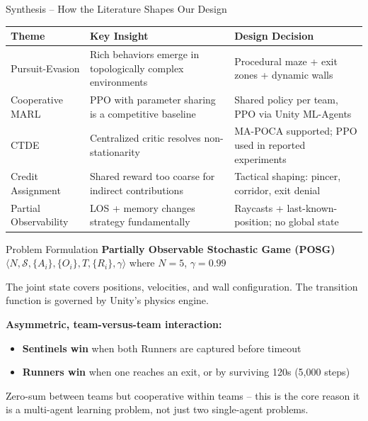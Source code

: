 \documentclass[aspectratio=169,11pt]{beamer}
\begin{document}
\begin{frame}{Synthesis -- How the Literature Shapes Our Design}
\begin{center}
\begin{tabular}{@{}p{2.5cm}p{5cm}p{4.5cm}@{}}
\toprule
\textbf{Theme} & \textbf{Key Insight} & \textbf{Design Decision} \\
\midrule
Pursuit-Evasion & Rich behaviors emerge in topologically complex environments & Procedural maze + exit zones + dynamic walls \\[4pt]
Cooperative MARL & PPO with parameter sharing is a competitive baseline & Shared policy per team, PPO via Unity ML-Agents \\[4pt]
CTDE & Centralized critic resolves non-stationarity & MA-POCA supported; PPO used in reported experiments \\[4pt]
Credit Assignment & Shared reward too coarse for indirect contributions & Tactical shaping: pincer, corridor, exit denial \\[4pt]
Partial Observability & LOS + memory changes strategy fundamentally & Raycasts + last-known-position; no global state \\
\bottomrule
\end{tabular}
\end{center}
\end{frame}

\begin{frame}{Problem Formulation}
\textbf{Partially Observable Stochastic Game (POSG)}\\[3pt]
$\langle N, \mathcal{S}, \{A_i\}, \{O_i\}, T, \{R_i\}, \gamma \rangle$ where $N{=}5$, $\gamma{=}0.99$

\vspace{6pt}
The joint state covers positions, velocities, and wall configuration. The transition function is governed by Unity's physics engine.

\vspace{6pt}
\textbf{Asymmetric, team-versus-team interaction:}
\begin{itemize}
\item \textbf{Sentinels win} when both Runners are captured before timeout
\item \textbf{Runners win} when one reaches an exit, or by surviving 120s (5,000 steps)
\end{itemize}

\vspace{6pt}
Zero-sum between teams but cooperative within teams -- this is the core reason it is a multi-agent learning problem, not just two single-agent problems.
\end{frame}
\end{document}
